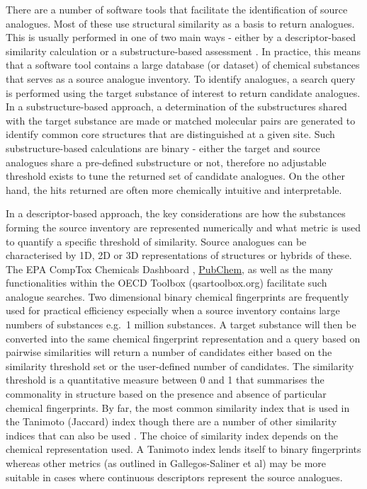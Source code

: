 \documentclass[
  super,
  preprint,
  3p]{elsarticle}
\begin{document}
There are a number of software tools that facilitate the identification
of source analogues. Most of these use structural similarity as a basis
to return analogues. This is usually performed in one of two main ways -
either by a descriptor-based similarity calculation or a
substructure-based assessment \citep{kunimoto_maximum_2016}. In
practice, this means that a software tool contains a large database (or
dataset) of chemical substances that serves as a source analogue
inventory. To identify analogues, a search query is performed using the
target substance of interest to return candidate analogues. In a
substructure-based approach, a determination of the substructures shared
with the target substance are made or matched molecular pairs
\citep{oboyle_using_2014, noauthor_matched_2021} are generated to
identify common core structures that are distinguished at a given site.
Such substructure-based calculations are binary - either the target and
source analogues share a pre-defined substructure or not, therefore no
adjustable threshold exists to tune the returned set of candidate
analogues. On the other hand, the hits returned are often more
chemically intuitive and interpretable.

In a descriptor-based approach, the key considerations are how the
substances forming the source inventory are represented numerically and
what metric is used to quantify a specific threshold of similarity.
Source analogues can be characterised by 1D, 2D or 3D representations of
structures or hybrids of these. The EPA CompTox Chemicals Dashboard
\citep{williams_comptox_2017},
\href{https://pubchem.ncbi.nlm.nih.gov/}{PubChem}, as well as the many
functionalities within the OECD Toolbox (qsartoolbox.org)
\citep{schultz_oecd_2018} facilitate such analogue searches. Two
dimensional binary chemical fingerprints are frequently used for
practical efficiency especially when a source inventory contains large
numbers of substances e.g.~1 million substances. A target substance will
then be converted into the same chemical fingerprint representation and
a query based on pairwise similarities will return a number of
candidates either based on the similarity threshold set or the
user-defined number of candidates. The similarity threshold is a
quantitative measure between 0 and 1 that summarises the commonality in
structure based on the presence and absence of particular chemical
fingerprints. By far, the most common similarity index that is used in
the Tanimoto (Jaccard) index \citep{bajusz_why_2015} though there are a
number of other similarity indices that can also be used
\citep{bajusz_why_2015, floris_generalizable_2014}. The choice of
similarity index depends on the chemical representation used. A Tanimoto
index lends itself to binary fingerprints whereas other metrics (as
outlined in Gallegos-Saliner et al\citep{saliner_ecb}) may be more
suitable in cases where continuous descriptors represent the source
analogues.
\end{document}
